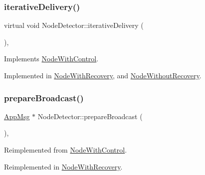 \subsubsection{\texorpdfstring{iterative\+Delivery()}{iterativeDelivery()}}
{\footnotesize\ttfamily virtual void Node\+Detector\+::iterative\+Delivery (\begin{DoxyParamCaption}{ }\end{DoxyParamCaption})\hspace{0.3cm}{\ttfamily [protected]}, {}}



Implements \hyperlink{class_node_with_control_a4f78078272b90937e0746c797443b37d}{Node\+With\+Control}.



Implemented in \hyperlink{class_node_with_recovery_a9b61912f38b62452584dc80bf261ef4e}{Node\+With\+Recovery}, and \hyperlink{class_node_without_recovery_a65e21db6d6b4e72b898fd567f8b4aee2}{Node\+Without\+Recovery}.

\mbox{\label{class_node_detector_af75cf37cc01fc51bc228a7a83c10cb97}} 
\subsubsection{\texorpdfstring{prepare\+Broadcast()}{prepareBroadcast()}}
{\footnotesize\ttfamily \hyperlink{class_app_msg}{App\+Msg} $\ast$ Node\+Detector\+::prepare\+Broadcast (\begin{DoxyParamCaption}{ }\end{DoxyParamCaption})\hspace{0.3cm}{\ttfamily [protected]}, {\ttfamily [virtual]}}



Reimplemented from \hyperlink{class_node_with_control_ab871014cf3f42d834f8d34ad5498174c}{Node\+With\+Control}.



Reimplemented in \hyperlink{class_node_with_recovery_a33d8e8775fd69cb647b38a54b36e1ebe}{Node\+With\+Recovery}.

\mbox{\label{class_node_detector_ab69432c6d3327a684845ec231826727e}} 
